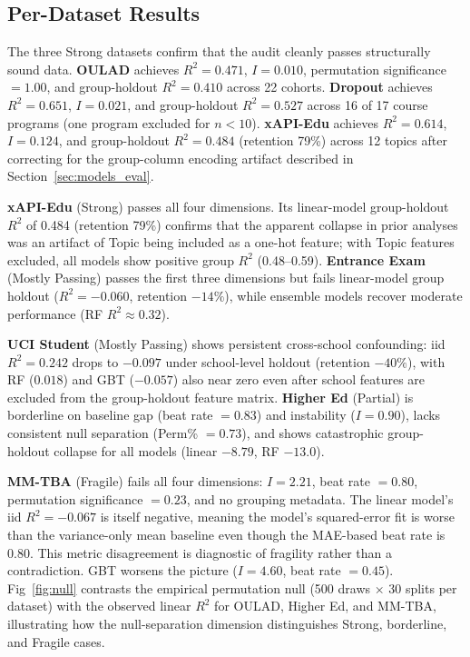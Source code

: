 \documentclass[10pt,letterpaper]{wlscirep}
\begin{document}
\subsection{Per-Dataset Results}

The three Strong datasets confirm that the audit cleanly passes structurally sound data. \textbf{OULAD} achieves $R^2 = 0.471$, $I = 0.010$, permutation significance $= 1.00$, and group-holdout $R^2 = 0.410$ across 22 cohorts. \textbf{Dropout} achieves $R^2 = 0.651$, $I = 0.021$, and group-holdout $R^2 = 0.527$ across 16 of 17 course programs (one program excluded for $n < 10$). \textbf{xAPI-Edu} achieves $R^2 = 0.614$, $I = 0.124$, and group-holdout $R^2 = 0.484$ (retention 79\%) across 12 topics after correcting for the group-column encoding artifact described in Section~\ref{sec:models_eval}.

\textbf{xAPI-Edu} (Strong) passes all four dimensions. Its linear-model group-holdout $R^2$ of 0.484 (retention 79\%) confirms that the apparent collapse in prior analyses was an artifact of Topic being included as a one-hot feature; with Topic features excluded, all models show positive group $R^2$ (0.48--0.59). \textbf{Entrance Exam} (Mostly Passing) passes the first three dimensions but fails linear-model group holdout ($R^2 = -0.060$, retention $-14\%$), while ensemble models recover moderate performance (RF $R^2 \approx 0.32$).

\textbf{UCI Student} (Mostly Passing) shows persistent cross-school confounding: iid $R^2 = 0.242$ drops to $-0.097$ under school-level holdout (retention $-40\%$), with RF ($0.018$) and GBT ($-0.057$) also near zero even after school features are excluded from the group-holdout feature matrix. \textbf{Higher Ed} (Partial) is borderline on baseline gap (beat rate $= 0.83$) and instability ($I = 0.90$), lacks consistent null separation (Perm\% $= 0.73$), and shows catastrophic group-holdout collapse for all models (linear $-8.79$, RF $-13.0$).

\textbf{MM-TBA} (Fragile) fails all four dimensions: $I = 2.21$, beat rate $= 0.80$, permutation significance $= 0.23$, and no grouping metadata. The linear model's iid $R^2 = -0.067$ is itself negative, meaning the model's squared-error fit is worse than the variance-only mean baseline even though the MAE-based beat rate is $0.80$. This metric disagreement is diagnostic of fragility rather than a contradiction. GBT worsens the picture ($I = 4.60$, beat rate $= 0.45$). Fig~\ref{fig:null} contrasts the empirical permutation null (500 draws $\times$ 30 splits per dataset) with the observed linear $R^2$ for OULAD, Higher Ed, and MM-TBA, illustrating how the null-separation dimension distinguishes Strong, borderline, and Fragile cases.
\end{document}
